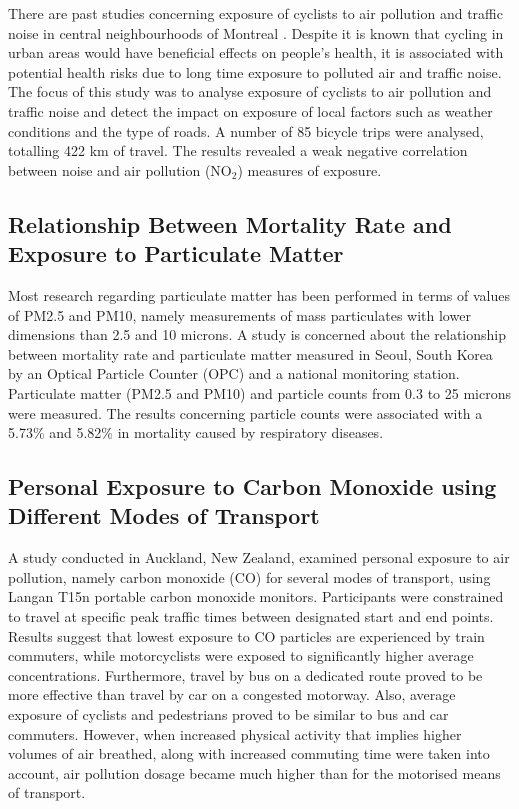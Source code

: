 \documentclass[bsc,frontabs,twoside,singlespacing, parskip,deptreport]{infthesis}     %
\begin{document}
There are past studies concerning exposure of cyclists to air pollution and traffic noise in central neighbourhoods of Montreal \cite{Apparicio201663}. Despite it is known that cycling in urban areas would have beneficial effects on people's health, it is associated with potential health risks due to long time exposure to polluted air and traffic noise. The focus of this study was to analyse exposure of cyclists to air pollution and traffic noise and detect the impact on exposure of local factors such as weather conditions and the type of roads. A number of 85 bicycle trips were analysed, totalling 422 km of travel. The results revealed a weak negative correlation between noise and air pollution (NO$_2$) measures of exposure.

\subsection{Relationship Between Mortality Rate and Exposure to Particulate Matter }

Most research regarding particulate matter has been performed in terms of values of PM2.5 and PM10, namely measurements of mass particulates with lower dimensions than 2.5 and 10 microns. A study \cite{Cho2008} is concerned about the relationship between mortality rate and particulate matter measured in Seoul, South Korea by an Optical Particle Counter (OPC) and a national monitoring station. Particulate matter (PM2.5 and PM10) and particle counts from 0.3 to 25 microns were measured. The results concerning particle counts were associated with a 5.73\% and 5.82\% in mortality caused by respiratory diseases.


\subsection{Personal Exposure to Carbon Monoxide using Different Modes of Transport}

A study \cite{Dirks2012} conducted in Auckland, New Zealand, examined personal exposure to air pollution, namely carbon monoxide (CO) for several modes of transport, using Langan T15n \cite{Langan} portable carbon monoxide monitors. Participants were constrained to travel at specific peak traffic times between designated start and end points. Results suggest that lowest exposure to CO particles are experienced by train commuters, while motorcyclists were exposed to significantly higher average concentrations. Furthermore, travel by bus on a dedicated route proved to be more effective than travel by car on a congested motorway. Also, average exposure of cyclists and pedestrians proved to be similar to bus and car commuters. However, when increased physical activity that implies higher volumes of air breathed, along with increased commuting time were taken into account, air pollution dosage became much higher than for the motorised means of transport. 
\end{document}
